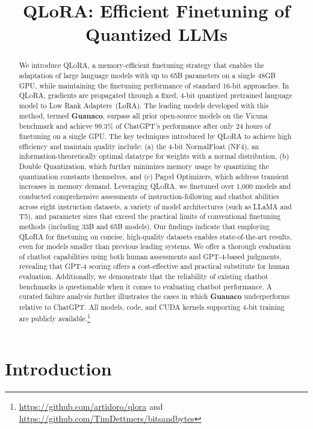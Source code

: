 \title{QLoRA: Efficient Finetuning of Quantized LLMs}

\begin{abstract}
We introduce \textsc{QLoRA}, a memory-efficient finetuning strategy that enables the adaptation of large language models with up to 65B parameters on a single 48GB GPU, while maintaining the finetuning performance of standard 16-bit approaches. In \textsc{QLoRA}, gradients are propagated through a fixed, 4-bit quantized pretrained language model to Low Rank Adapters~(LoRA). The leading models developed with this method, termed \textbf{Guanaco}, surpass all prior open-source models on the Vicuna benchmark and achieve 99.3\% of ChatGPT's performance after only 24 hours of finetuning on a single GPU. The key techniques introduced by \textsc{QLoRA} to achieve high efficiency and maintain quality include: (a) the 4-bit NormalFloat (NF4), an information-theoretically optimal datatype for weights with a normal distribution, (b) Double Quantization, which further minimizes memory usage by quantizing the quantization constants themselves, and (c) Paged Optimizers, which address transient increases in memory demand. Leveraging \textsc{QLoRA}, we finetuned over 1,000 models and conducted comprehensive assessments of instruction-following and chatbot abilities across eight instruction datasets, a variety of model architectures (such as LLaMA and T5), and parameter sizes that exceed the practical limits of conventional finetuning methods (including 33B and 65B models). Our findings indicate that employing QLoRA for finetuning on concise, high-quality datasets enables state-of-the-art results, even for models smaller than previous leading systems. We offer a thorough evaluation of chatbot capabilities using both human assessments and GPT-4-based judgments, revealing that GPT-4 scoring offers a cost-effective and practical substitute for human evaluation. Additionally, we demonstrate that the reliability of existing chatbot benchmarks is questionable when it comes to evaluating chatbot performance. A curated failure analysis further illustrates the cases in which \textbf{Guanaco} underperforms relative to ChatGPT. All models, code, and CUDA kernels supporting 4-bit training are publicly available.\footnote{\url{https://github.com/artidoro/qlora} and \url{https://github.com/TimDettmers/bitsandbytes}}
\end{abstract}

\section{Introduction}

